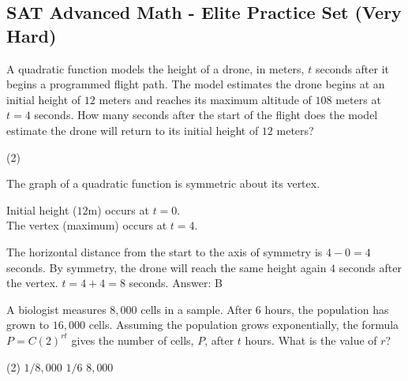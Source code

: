 \documentclass[11pt,paper=a4,answers]{exam}
\begin{document}
\begin{questions}
\pointsinrightmargin
\pointsdroppedatright
\marksnotpoints
{}
\pointformat{\boldmath\themarginpoints}
\bracketedpoints

\section*{SAT Advanced Math - Elite Practice Set (Very Hard)}

\question
A quadratic function models the height of a drone, in meters, $t$ seconds after it begins a programmed flight path. The model estimates the drone begins at an initial height of $12$ meters and reaches its maximum altitude of $108$ meters at $t = 4$ seconds. How many seconds after the start of the flight does the model estimate the drone will return to its initial height of $12$ meters?
\begin{tasks}(2)
       
\end{tasks}

\begin{solution}
The graph of a quadratic function is symmetric about its vertex. 
\vspace{5pt}
\begin{center}
Initial height ($12$m) occurs at $t = 0$. \\
The vertex (maximum) occurs at $t = 4$.
\end{center}
\vspace{5pt}
The horizontal distance from the start to the axis of symmetry is $4 - 0 = 4$ seconds. By symmetry, the drone will reach the same height again $4$ seconds after the vertex.
\vspace{5pt}
$t = 4 + 4 = 8$ seconds.
\vspace{5pt}
Answer: \colorbox{yellow!100}{B}
\end{solution}

\vspace{1cm}

\question
A biologist measures $8,000$ cells in a sample. After $6$ hours, the population has grown to $16,000$ cells. Assuming the population grows exponentially, the formula $P = C(2)^{rt}$ gives the number of cells, $P$, after $t$ hours. What is the value of $r$?
\begin{tasks}(2)
    \task $1/8,000$ \task $1/6$  \task $8,000$
\end{tasks}


\end{questions}
\end{document}

